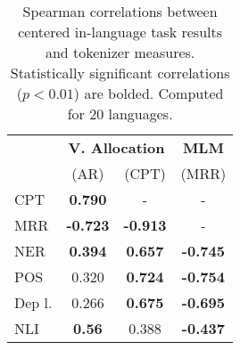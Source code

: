 \begin{table}
\centering

\begin{tabular}{lccc}
\toprule
 & \multicolumn{2}{c}{\bf{V. Allocation}} & \bf{MLM} \\
 & (AR) &  (CPT)  &  (MRR) \\
\midrule
CPT    &    \bf{0.790} &     - &  - \\
MRR    &  \bf{-0.723} &  \bf{-0.913} &  - \\
NER    &   \bf{0.394} &   \bf{0.657} &  \bf{-0.745} \\
POS    &     0.320 &   \bf{0.724} &  \bf{-0.754} \\
Dep l. &     0.266 &   \bf{0.675} &  \bf{-0.695} \\
NLI   &    \bf{0.56} &    0.388 &  \bf{-0.437} \\ 
\bottomrule
\end{tabular}
\caption{Spearman correlations between centered in-language task results and tokenizer measures. Statistically significant correlations ($p<0.01$) are bolded. Computed for 20 languages.}
\label{tab:corr_in_lang_20l}
\end{table}